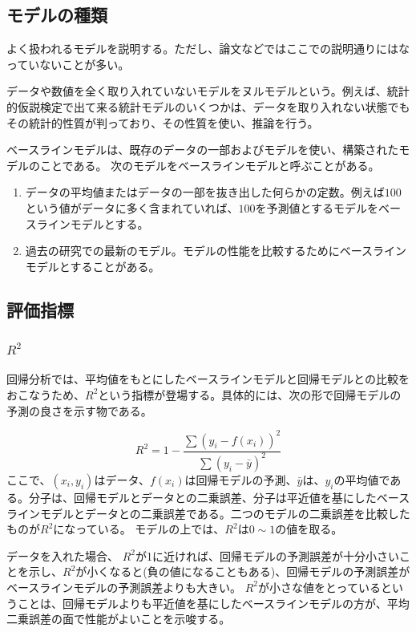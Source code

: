 
\subsection{モデルの種類}
よく扱われるモデルを説明する。ただし、論文などではここでの説明通りにはなっていないことが多い。

データや数値を全く取り入れていないモデルをヌルモデルという。例えば、統計的仮説検定で出て来る統計モデルのいくつかは、データを取り入れない状態でもその統計的性質が判っており、その性質を使い、推論を行う。


ベースラインモデルは、既存のデータの一部およびモデルを使い、構築されたモデルのことである。
次のモデルをベースラインモデルと呼ぶことがある。
\begin{enumerate}
 \item データの平均値またはデータの一部を抜き出した何らかの定数。例えば$100$という値がデータに多く含まれていれば、$100$を予測値とするモデルをベースラインモデルとする。
 \item 過去の研究での最新のモデル。モデルの性能を比較するためにベースラインモデルとすることがある。
\end{enumerate}

\subsection{評価指標}
\subsubsection{$R^2$}
回帰分析では、平均値をもとにしたベースラインモデルと回帰モデルとの比較をおこなうため、$R^2$という指標が登場する。具体的には、次の形で回帰モデルの予測の良さを示す物である。

\begin{equation}
R^2 = 1- \frac{\sum (y_i-f(x_i))^2}{\sum (y_i-\bar{y})^2}
\end{equation}
ここで、$(x_i,y_i)$はデータ、$f(x_i)$は回帰モデルの予測、$\bar{y}$は、$y_i$の平均値である。分子は、回帰モデルとデータとの二乗誤差、分子は平近値を基にしたベースラインモデルとデータとの二乗誤差である。二つのモデルの二乗誤差を比較したものが$R^2$になっている。
モデルの上では、$R^2$は$0\sim 1$の値を取る。

データを入れた場合、
$R^2$が1に近ければ、回帰モデルの予測誤差が十分小さいことを示し、$R^2$が小くなると(負の値になることもある)、回帰モデルの予測誤差がベースラインモデルの予測誤差よりも大きい。
$R^2$が小さな値をとっているということは、回帰モデルよりも平近値を基にしたベースラインモデルの方が、平均二乗誤差の面で性能がよいことを示唆する。

